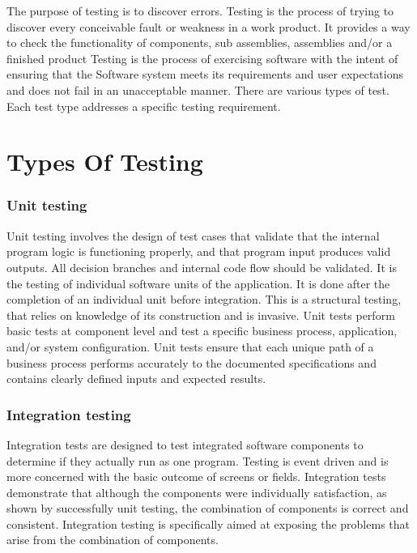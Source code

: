 \documentclass[12pt,a4paper]{report}
\begin{document}
The purpose of testing is to discover errors. Testing is the process of trying to
discover every conceivable fault or weakness in a work product. It provides a way to
check the functionality of components, sub assemblies, assemblies and/or a finished
product Testing is the process of exercising software with the intent of ensuring that
the Software system meets its requirements and user expectations and does not fail in
an unacceptable manner. There are various types of test. Each test type addresses a
specific testing requirement.
\section{Types Of Testing}
\subsubsection{Unit testing}
Unit testing involves the design of test cases that validate that the internal
program logic is functioning properly, and that program input produces valid outputs.
All decision branches and internal code flow should be validated. It is the testing of
individual software units of the application. It is done after the completion of an
individual unit before integration. This is a structural testing, that relies on knowledge
of its construction and is invasive. Unit tests perform basic tests at component level
and test a specific business process, application, and/or system configuration. Unit
tests ensure that each unique path of a business process performs accurately to the
documented specifications and contains clearly defined inputs and expected results.
\subsubsection{Integration testing}
Integration tests are designed to test integrated software components to
determine if they actually run as one program. Testing is event driven and is more
concerned with the basic outcome of screens or fields. Integration tests demonstrate
that although the components were individually satisfaction, as shown by successfully
unit testing, the combination of components is correct and consistent. Integration
testing is specifically aimed at exposing the problems that arise from the combination
of components.
\end{document}

